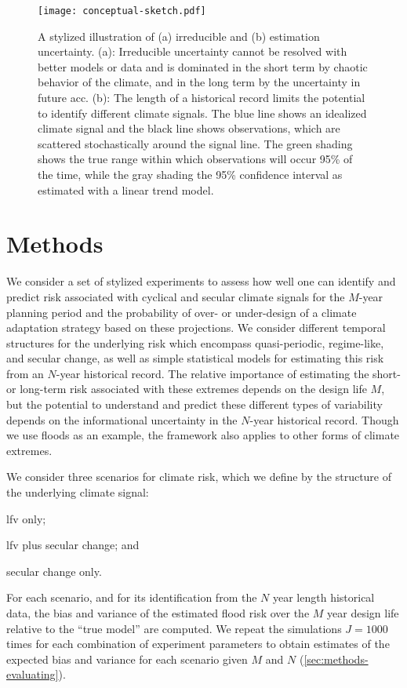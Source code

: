 \documentclass[
  draft,
  linenumbers
]{agujournal2018}
\begin{document}
\begin{figure}
  \centering
  \texttt{[image: conceptual-sketch.pdf]}
  \caption{
    A stylized illustration of (a) irreducible and (b) estimation uncertainty.
    (a): Irreducible uncertainty cannot be resolved with better models or data and is dominated in the short term by chaotic behavior of the climate, and in the long term by the uncertainty in future \acrlong{acc}.
    (b): The length of a historical record limits the potential to identify different climate signals.
    The blue line shows an idealized climate signal and the black line shows observations, which are scattered stochastically around the signal line.
    The green shading shows the true range within which observations will occur 95\% of the time, while the gray shading the 95\% confidence interval as estimated with a linear trend model.
    }\label{fig:conceptual-sketch}
\end{figure}


\section{Methods}\label{sec:methods}

We consider a set of stylized experiments to assess how well one can identify and predict risk associated with cyclical and secular climate signals for the $M$-year planning period and the probability of over- or under-design of a climate adaptation strategy based on these projections.
We consider different temporal structures for the underlying risk which encompass quasi-periodic, regime-like, and secular change, as well as simple statistical models for estimating this risk from an $N$-year historical record.
The relative importance of estimating the short- or long-term risk associated with these extremes depends on the design life $M$, but the potential to understand and predict these different types of variability depends on the informational uncertainty in the $N$-year historical record.
Though we use floods as an example, the framework also applies to other forms of climate extremes.

We consider three scenarios for climate risk, which we define by the structure of the underlying climate signal:
\begin{enumerate*}[label= (\roman*)]
  \item \gls{lfv} only;
  \item \gls{lfv} plus secular change; and
  \item secular change only.
\end{enumerate*}
For each scenario, and for its identification from the $N$ year length historical data, the bias and variance of the estimated flood risk over the $M$ year design life relative to the ``true model'' are computed.
We repeat the simulations $J = 1000$ times for each combination of experiment parameters to obtain estimates of the expected bias and variance for each scenario given $M$ and $N$ (\cref{sec:methods-evaluating}).
\end{document}
